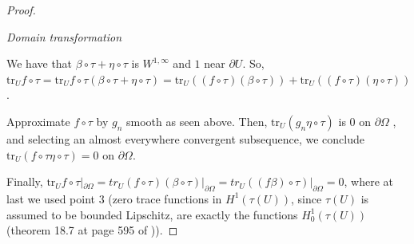 \documentclass[english,a4paper,9pt,oneside]{scrbook}	%
\theoremstyle{break}
\newenvironment{mproof}[1][\proofname]{%
  \begin{proof}[#1]$ $\par\nobreak\ignorespaces
}{%
  \end{proof}
}
\renewcommand*{\proofname}{Proof}
\theoremstyle{remark}
\newcommand{\tr}{\text{tr}}
\begin{document}
\begin{appendices}
\begin{mproof}
%

\textit{Domain transformation}


We have that $\beta \circ \tau +  \eta \circ \tau$ is $W^{1,\infty}$ and $1$ near $\partial U$. 
So, $\tr_U f\circ \tau = \tr_U f\circ \tau(\beta \circ \tau +  \eta \circ \tau) = \tr_U ((f\circ \tau)(\beta \circ \tau)) + \tr_U ((f\circ \tau )( \eta \circ \tau))$.

Approximate $f\circ \tau$ by $g_n$ smooth as seen above.  Then, $\tr_U (g_n \eta \circ \tau)$ is $0$ on $\partial \Omega$ , and  selecting an almost everywhere convergent subsequence, we conclude $\tr_U (f\circ \tau \eta \circ \tau) = 0$ on $\partial \Omega$. 

Finally, $\tr_U f\circ \tau|_{\partial \Omega} = tr_U (f\circ \tau)(\beta \circ \tau)|_{\partial \Omega} =  tr_U ((f\beta) \circ \tau)|_{\partial \Omega}= 0$, where at last we used point $3$ (zero trace functions in $H^1(\tau(U))$, since $\tau(U)$ is assumed to be bounded Lipschitz, are exactly the functions $H^1_0(\tau(U))$ (theorem 18.7 at page 595 of \cite{leoni})).
\end{mproof}


\end{appendices}
\end{document}
